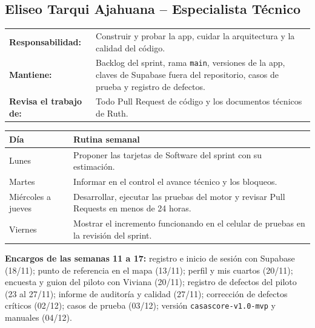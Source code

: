 \documentclass[11pt,a4paper]{article}
\begin{document}
\subsection{Eliseo Tarqui Ajahuana -- Especialista Técnico}
{\small
\noindent\begin{tabularx}{\textwidth}{@{}P{3.4cm} L@{}}
\toprule
\textbf{Responsabilidad:} & Construir y probar la app, cuidar la arquitectura y la calidad del código. \\
\textbf{Mantiene:} & Backlog del sprint, rama \texttt{main}, versiones de la app, claves de Supabase fuera del repositorio, casos de prueba y registro de defectos. \\
\textbf{Revisa el trabajo de:} & Todo Pull Request de código y los documentos técnicos de Ruth. \\
\bottomrule
\end{tabularx}
}

\vspace{0.1cm}
{\small
{}
\noindent\begin{tabularx}{\textwidth}{@{}P{2.4cm} L@{}}
\toprule
{}
\textbf{Día} & \textbf{Rutina semanal} \\
\midrule
Lunes & Proponer las tarjetas de Software del sprint con su estimación. \\
Martes & Informar en el control el avance técnico y los bloqueos. \\
Miércoles a jueves & Desarrollar, ejecutar las pruebas del motor y revisar Pull Requests en menos de 24 horas. \\
Viernes & Mostrar el incremento funcionando en el celular de pruebas en la revisión del sprint. \\
\bottomrule
\end{tabularx}
}

\vspace{0.1cm}
\noindent\textbf{Encargos de las semanas 11 a 17:} registro e inicio de sesión con Supabase (18/11); punto de referencia en el mapa (13/11); perfil y mis cuartos (20/11); encuesta y guion del piloto con Viviana (20/11); registro de defectos del piloto (23 al 27/11); informe de auditoría y calidad (27/11); corrección de defectos críticos (02/12); casos de prueba (03/12); versión \texttt{casascore-v1.0-mvp} y manuales (04/12).

\end{document}
